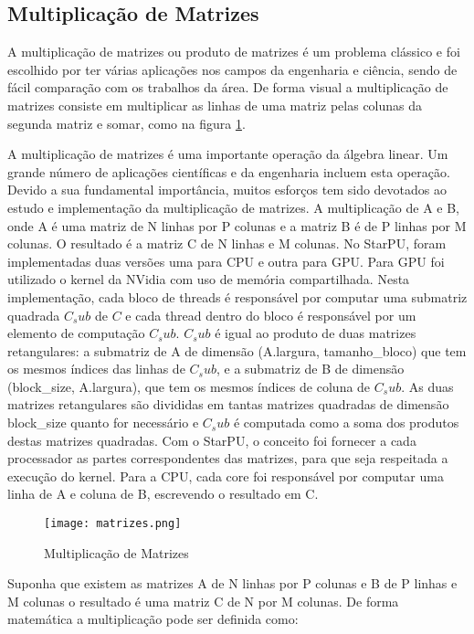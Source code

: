 \subsection{Multiplicação de Matrizes}

A multiplicação de matrizes ou produto de matrizes é um problema clássico e foi escolhido por ter várias aplicações nos campos da engenharia e ciência, sendo de fácil comparação com os trabalhos da área. De forma visual a multiplicação de matrizes consiste em multiplicar as linhas de uma matriz pelas colunas da segunda matriz e somar, como na figura \ref{fig: matrizes}.

A multiplicação de matrizes é uma importante operação da álgebra linear. Um grande número de aplicações científicas e da engenharia incluem esta operação. Devido a sua fundamental importância, muitos esforços tem sido devotados ao estudo e implementação da multiplicação de matrizes. A multiplicação de A e B, onde A é uma matriz de N linhas por P colunas e a matriz B é de P linhas por M colunas. O resultado é a matriz C de N linhas e M colunas. No StarPU, foram implementadas duas versões uma para CPU e outra para GPU. Para GPU foi utilizado o kernel da NVidia com uso de memória compartilhada.  Nesta implementação, cada bloco de threads é responsável por computar uma submatriz quadrada $C_sub$ de $C$ e cada thread dentro do bloco é responsável por um elemento de computação $C_sub$. $C_sub$ é igual ao produto de duas matrizes retangulares: a submatriz de A de dimensão (A.largura, tamanho\_bloco) que tem os mesmos índices das linhas de $C_sub$, e a submatriz de B de dimensão (block\_size, A.largura), que tem os mesmos índices de coluna de $C_sub$. As duas matrizes retangulares são divididas em tantas matrizes quadradas de dimensão block\_size quanto for necessário e $C_sub$ é computada como a soma dos produtos destas matrizes quadradas. Com o StarPU, o conceito foi fornecer a cada processador as partes correspondentes das matrizes, para que seja respeitada a execução do kernel. Para a CPU, cada core foi responsável por computar uma linha de A e coluna de B, escrevendo o resultado em C.

\begin{figure}[htb]
	\begin{center}
	\centering
			\texttt{[image: matrizes.png]}
	\caption{Multiplicação de Matrizes}
	\label{fig: matrizes}
	\end{center}
\end{figure}

Suponha que existem as matrizes A de N linhas por P colunas e B de P linhas e M colunas o resultado é uma matriz C de N por M colunas. De forma matemática a multiplicação pode ser definida como:

